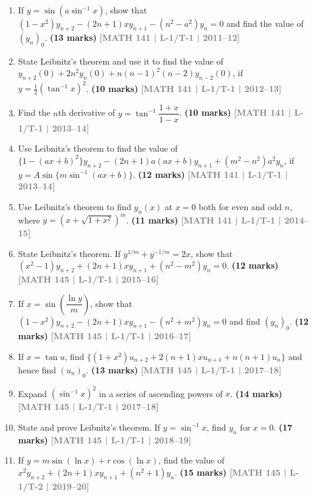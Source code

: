 \documentclass[12pt,a4paper]{article}
\newcommand{\yr}[1]{\hfill\textcolor{gray}{\small\textbf{[#1]}}}
\newcommand{\mk}[1]{\textcolor{orange!70!black}{\small\textbf{(#1 marks)}}}
\begin{document}
\begin{enumerate}
\item If $y=\sin(a\sin^{-1}x)$, show that $(1-x^{2})y_{n+2}-(2n+1)xy_{n+1}-(n^{2}-a^{2})y_{n}=0$ and find the value of $(y_{n})_{0}$.
\mk{13} \yr{MATH 141 | L-1/T-1 | 2011--12}

\item State Leibnitz's theorem and use it to find the value of $y_{n+2}(0)+2n^{2}y_{n}(0)+n(n-1)^{2}(n-2)y_{n-2}(0)$, if $y=\tfrac{1}{2}(\tan^{-1}x)^{2}$.
\mk{10} \yr{MATH 141 | L-1/T-1 | 2012--13}

\item Find the $n$th derivative of $y=\tan^{-1}\!\dfrac{1+x}{1-x}$.
\mk{10} \yr{MATH 141 | L-1/T-1 | 2013--14}

\item Use Leibnitz's theorem to find the value of $\{1-(ax+b)^{2}\}y_{n+2}-(2n+1)a(ax+b)y_{n+1}+(m^{2}-n^{2})a^{2}y_{n}$, if $y=A\sin\{m\sin^{-1}(ax+b)\}$.
\mk{12} \yr{MATH 141 | L-1/T-1 | 2013--14}

\item Use Leibnitz's theorem to find $y_{n}(x)$ at $x=0$ both for even and odd $n$, where $y=\left(x+\sqrt{1+x^{2}}\right)^{m}$.
\mk{11} \yr{MATH 141 | L-1/T-1 | 2014--15}

\item State Leibnitz's theorem. If $y^{1/m}+y^{-1/m}=2x$, show that $(x^{2}-1)y_{n+2}+(2n+1)xy_{n+1}+(n^{2}-m^{2})y_{n}=0$.
\mk{12} \yr{MATH 145 | L-1/T-1 | 2015--16}

\item If $x=\sin\!\left(\dfrac{\ln y}{m}\right)$, show that $(1-x^{2})y_{n+2}-(2n+1)xy_{n+1}-(n^{2}+m^{2})y_{n}=0$ and find $(y_{n})_{0}$.
\mk{12} \yr{MATH 145 | L-1/T-1 | 2016--17}

\item If $x=\tan u$, find $\{(1+x^{2})u_{n+2}+2(n+1)xu_{n+1}+n(n+1)u_{n}\}$ and hence find $(u_{n})_{0}$.
\mk{13} \yr{MATH 145 | L-1/T-1 | 2017--18}

\item Expand $(\sin^{-1}x)^{2}$ in a series of ascending powers of $x$.
\mk{14} \yr{MATH 145 | L-1/T-1 | 2017--18}

\item State and prove Leibnitz's theorem. If $y=\sin^{-1}x$, find $y_{n}$ for $x=0$.
\mk{17} \yr{MATH 145 | L-1/T-1 | 2018--19}

\item If $y=m\sin(\ln x)+r\cos(\ln x)$, find the value of $x^{2}y_{n+2}+(2n+1)xy_{n+1}+(n^{2}+1)y_{n}$.
\mk{15} \yr{MATH 145 | L-1/T-2 | 2019--20}


\end{enumerate}
\end{document}
